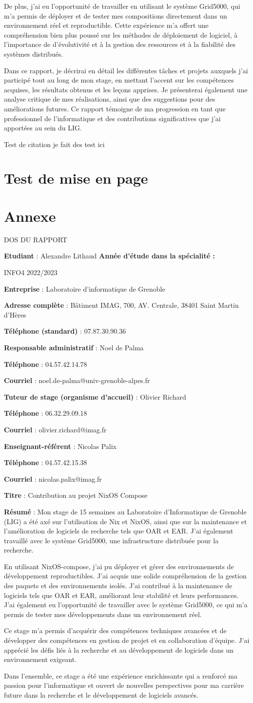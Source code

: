 \documentclass[a4paper,french,12pt, titlepage]{article}
\makeatletter
\newcommand{\makefooter}{%
  \makefooterhooka
}
\newcommand{\makefooterhooka}{%
    \begin{center}
        \begin{Large}
        DOS DU RAPPORT
        \end{Large}
    \end{center}
    
    
    \textbf{Etudiant} : Alexandre Lithaud
    \hfill \textbf{Année d’étude dans la spécialité :}
    
    \hfill INFO4 2022/2023
    
    \hfill
    
    \textbf{Entreprise} : Laboratoire d'informatique de Grenoble 

    \textbf{Adresse complète} : Bâtiment IMAG, 700, AV. Centrale, 38401
Saint Martin d'Hères

    \textbf{Téléphone (standard)} : 07.87.30.90.36
    
    \hfill
    
    \textbf{Responsable administratif} : Noel de Palma 

    \textbf{Téléphone} : 04.57.42.14.78

    \textbf{Courriel} : noel.de-palma@univ-grenoble-alpes.fr

    \hfill
    
    \textbf{Tuteur de stage (organisme d’accueil)} : Olivier Richard

    \textbf{Téléphone} : 06.32.29.09.18

    \textbf{Courriel} : olivier.richard@imag.fr
    
    \hfill
    
    \textbf{Enseignant-référent} : Nicolas Palix

    \textbf{Téléphone} : 04.57.42.15.38 

    \textbf{Courriel} : nicolas.palix@imag.fr 

    \hfill
    
    \textbf{Titre} : Contribution au projet NixOS Compose
    
    \hfill

    \textbf{Résumé} : Mon stage de 15 semaines au Laboratoire
d'Informatique de Grenoble (LIG) a été axé sur l'utilisation de Nix et
NixOS, ainsi que sur la maintenance et l'amélioration de logiciels de
recherche tels que OAR et EAR. J'ai également travaillé avec le système
Grid5000, une infrastructure distribuée pour la recherche.\newline

En utilisant NixOS-compose, j'ai pu déployer et gérer des environnements
de développement reproductibles. J'ai acquis une solide compréhension de
la gestion des paquets et des environnements isolés. J'ai contribué à la
maintenance de logiciels tels que OAR et EAR, améliorant leur stabilité
et leurs performances. J'ai également eu l'opportunité de travailler
avec le système Grid5000, ce qui m'a permis de tester mes développements
dans un environnement réel.\newline

Ce stage m'a permis d'acquérir des compétences techniques avancées et de
développer des compétences en gestion de projet et en collaboration
d'équipe. J'ai apprécié les défis liés à la recherche et au
développement de logiciels dans un environnement exigeant.\newline

Dans l'ensemble, ce stage a été une expérience enrichissante qui a
renforcé ma passion pour l'informatique et ouvert de nouvelles
perspectives pour ma carrière future dans la recherche et le
développement de logiciels avancés.
}
\makeatother
\begin{document}
De plus, j'ai eu l'opportunité de travailler en utilisant le système
Grid5000, qui m'a permis de déployer et de tester mes compositions
directement dans un environnement réel et reproductible. Cette
expérience m'a offert une compréhension bien plus poussé sur les
méthodes de déploiement de logiciel, à l'importance de d'évolutivité et
à la gestion des ressources et à la fiabilité des systèmes
distribués.\newline

Dans ce rapport, je décrirai en détail les différentes tâches et projets
auxquels j'ai participé tout au long de mon stage, en mettant l'accent
sur les compétences acquises, les résultats obtenus et les leçons
apprises. Je présenterai également une analyse critique de mes
réalisations, ainsi que des suggestions pour des améliorations futures.
Ce rapport témoigne de ma progression en tant que professionnel de
l'informatique et des contributions significatives que j'ai apportées au
sein du LIG.\newline

Test de citation \cite{grid5000} je fait des test ici\newline

\newpage

\hypertarget{test-de-mise-en-page}{%
\section{Test de mise en page}\label{test-de-mise-en-page}}

\newpage

\hypertarget{annexe}{%
\section{Annexe}\label{annexe}}

\listoffigures

\printbibliography

\begin{titlingpage}
\newpage
\makefooter
\end{titlingpage}
\end{document}
